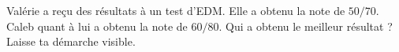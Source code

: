 %
%
    Valérie a reçu des résultats à un test d'EDM. Elle a obtenu la note de $50/70$. Caleb quant à lui a obtenu la note de $60/80$. Qui a obtenu le meilleur résultat ?\\
    Laisse ta démarche visible.
